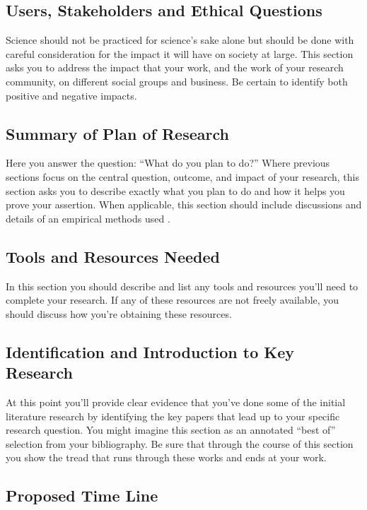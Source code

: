 \documentclass[10pt]{article}
\begin{document}
\subsection{Users, Stakeholders and Ethical Questions}

Science should not be practiced for science's sake alone but should be done with careful consideration for the impact it will have on society at large.  This section asks you to address the impact that your work, and the work of your research community, on different social groups and business.  Be certain to identify both positive and negative impacts.  

\subsection{Summary of Plan of Research}

Here you answer the question: ``What do you plan to do?''  Where previous sections focus on the central question, outcome, and impact of your research, this section asks you to describe exactly what you plan to do and how it helps you prove your assertion.  When applicable, this section should include discussions and details of an empirical methods used .

\subsection{Tools and Resources Needed}

In this section you should describe and list any tools and resources you'll need to complete your research.  If any of these resources are not freely available, you should discuss how you're obtaining these resources.  

\subsection{Identification and Introduction to Key Research}

At this point you'll provide clear evidence that you've done some of the initial literature research by identifying the key papers that lead up to your specific research question.  You might imagine this section as an annotated ``best of'' selection from your bibliography.  Be sure that through the course of this section you show the tread that runs through these works and ends at your work.


\subsection{Proposed  Time Line}
\end{document}
